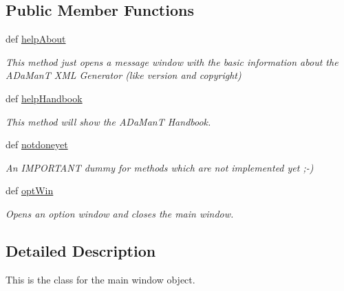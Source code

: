 \subsection*{Public Member Functions}
\begin{DoxyCompactItemize}
\item 
\hypertarget{classgui_1_1window3a_1_1MainWindow_ad4f4bbba4c4a628d0a35195b093d6049}{def \hyperlink{classgui_1_1window3a_1_1MainWindow_ad4f4bbba4c4a628d0a35195b093d6049}{help\-About}}\label{classgui_1_1window3a_1_1MainWindow_ad4f4bbba4c4a628d0a35195b093d6049}

\begin{DoxyCompactList}\small\item\em This method just opens a message window with the basic information about the A\-Da\-Man\-T X\-M\-L Generator (like version and copyright) \end{DoxyCompactList}\item 
def \hyperlink{classgui_1_1window3a_1_1MainWindow_a784d15d1157ea5b181c63d73daa3fc5e}{help\-Handbook}
\begin{DoxyCompactList}\small\item\em This method will show the A\-Da\-Man\-T Handbook. \end{DoxyCompactList}\item 
\hypertarget{classgui_1_1window3a_1_1MainWindow_a615f3073891733337c33f599f89ec7ef}{def \hyperlink{classgui_1_1window3a_1_1MainWindow_a615f3073891733337c33f599f89ec7ef}{notdoneyet}}\label{classgui_1_1window3a_1_1MainWindow_a615f3073891733337c33f599f89ec7ef}

\begin{DoxyCompactList}\small\item\em An I\-M\-P\-O\-R\-T\-A\-N\-T dummy for methods which are not implemented yet ;-\/) \end{DoxyCompactList}\item 
\hypertarget{classgui_1_1window3a_1_1MainWindow_a2cc0c3d64b049aac95bc9fdbb9673050}{def \hyperlink{classgui_1_1window3a_1_1MainWindow_a2cc0c3d64b049aac95bc9fdbb9673050}{opt\-Win}}\label{classgui_1_1window3a_1_1MainWindow_a2cc0c3d64b049aac95bc9fdbb9673050}

\begin{DoxyCompactList}\small\item\em Opens an option window and closes the main window. \end{DoxyCompactList}\end{DoxyCompactItemize}


\subsection{Detailed Description}
This is the class for the main window object. 


